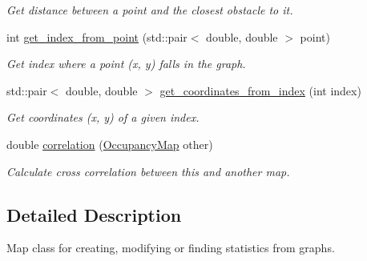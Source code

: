 \begin{DoxyCompactItemize}
\begin{DoxyCompactList}\small\item\em Get distance between a point and the closest obstacle to it. \end{DoxyCompactList}\item 
\hypertarget{classOccupancyMap_a90e20a6f32633c276ece4849c8e9e79c}{int \hyperlink{classOccupancyMap_a90e20a6f32633c276ece4849c8e9e79c}{get\-\_\-index\-\_\-from\-\_\-point} (std\-::pair$<$ double, double $>$ point)}\label{classOccupancyMap_a90e20a6f32633c276ece4849c8e9e79c}

\begin{DoxyCompactList}\small\item\em Get index where a point (x, y) falls in the graph. \end{DoxyCompactList}\item 
\hypertarget{classOccupancyMap_afe1a23a75038f4b92fffdfcd79aa683a}{std\-::pair$<$ double, double $>$ \hyperlink{classOccupancyMap_afe1a23a75038f4b92fffdfcd79aa683a}{get\-\_\-coordinates\-\_\-from\-\_\-index} (int index)}\label{classOccupancyMap_afe1a23a75038f4b92fffdfcd79aa683a}

\begin{DoxyCompactList}\small\item\em Get coordinates (x, y) of a given index. \end{DoxyCompactList}\item 
\hypertarget{classOccupancyMap_a341be2d2b5bdb75975e9977260db9838}{double \hyperlink{classOccupancyMap_a341be2d2b5bdb75975e9977260db9838}{correlation} (\hyperlink{classOccupancyMap}{Occupancy\-Map} other)}\label{classOccupancyMap_a341be2d2b5bdb75975e9977260db9838}

\begin{DoxyCompactList}\small\item\em Calculate cross correlation between this and another map. \end{DoxyCompactList}\end{DoxyCompactItemize}


\subsection{Detailed Description}
Map class for creating, modifying or finding statistics from graphs. 

